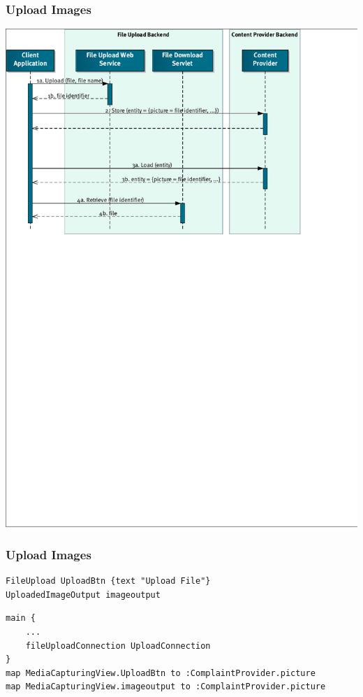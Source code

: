 \begin{frame}[plain]
\frametitle{Upload Images}
\plainnumber
\begin{center}
\includegraphics[width=1\textwidth, trim = 0.5mm 10cm 3.3cm 0.5mm, clip = true] {images/UML-diagrams.pdf}
\end{center}
\end{frame}

\begin{frame}[fragile]
\frametitle{Upload Images}
\begin{lstlisting}[basicstyle=\footnotesize\ttfamily]
FileUpload UploadBtn {text "Upload File"}
UploadedImageOutput imageoutput
\end{lstlisting}

\vfill

\begin{lstlisting}[basicstyle=\footnotesize\ttfamily]
main {
	...  
	fileUploadConnection UploadConnection
}
map MediaCapturingView.UploadBtn to :ComplaintProvider.picture
map MediaCapturingView.imageoutput to :ComplaintProvider.picture
\end{lstlisting}
\end{frame}

